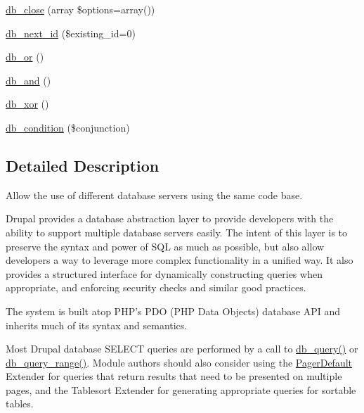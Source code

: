 \begin{DoxyCompactItemize}
\item 
\hyperlink{group__database_ga3ee89e12a6f70888bfe4ac30f89df442}{db\_\-close} (array \$options=array())
\item 
\hyperlink{group__database_gab0a2cb3e94525a74407740043b821c5b}{db\_\-next\_\-id} (\$existing\_\-id=0)
\item 
\hyperlink{group__database_ga1a7695a360b8c2219fe1998dfc272080}{db\_\-or} ()
\item 
\hyperlink{group__database_ga39ab6e9c3b5316eb4d8fe8f52af91acc}{db\_\-and} ()
\item 
\hyperlink{group__database_ga85bb17ee005f930dd2caa93f0752d0e8}{db\_\-xor} ()
\item 
\hyperlink{group__database_ga7e591c732d1eb7da6813ef79867a9859}{db\_\-condition} (\$conjunction)
\end{DoxyCompactItemize}


\subsection{Detailed Description}
Allow the use of different database servers using the same code base.

Drupal provides a database abstraction layer to provide developers with the ability to support multiple database servers easily. The intent of this layer is to preserve the syntax and power of SQL as much as possible, but also allow developers a way to leverage more complex functionality in a unified way. It also provides a structured interface for dynamically constructing queries when appropriate, and enforcing security checks and similar good practices.

The system is built atop PHP's PDO (PHP Data Objects) database API and inherits much of its syntax and semantics.

Most Drupal database SELECT queries are performed by a call to \hyperlink{group__database_gafa3b6cb2b2f61479cc63a4150c62da9b}{db\_\-query()} or \hyperlink{group__database_gadd8bfb4984a4c69ac741b2bb20d6b9bf}{db\_\-query\_\-range()}. Module authors should also consider using the \hyperlink{classPagerDefault}{PagerDefault} Extender for queries that return results that need to be presented on multiple pages, and the Tablesort Extender for generating appropriate queries for sortable tables.

